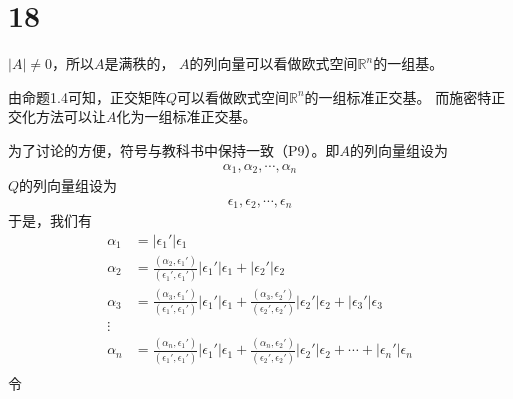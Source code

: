 \documentclass{article}
\begin{document}
\section*{18}

$|A| \neq 0$，所以$A$是满秩的，
$A$的列向量可以看做欧式空间$\mathbb{R}^n$的一组基。

由命题1.4可知，正交矩阵$Q$可以看做欧式空间$\mathbb{R}^n$的一组标准正交基。
而施密特正交化方法可以让$A$化为一组标准正交基。

为了讨论的方便，符号与教科书中保持一致（P9）。即$A$的列向量组设为
\begin{align*}
  \alpha_1, \alpha_2, \cdots, \alpha_n
\end{align*}
$Q$的列向量组设为
\begin{align*}
  \epsilon_1, \epsilon_2, \cdots, \epsilon_n
\end{align*}
于是，我们有
\begin{align*}
  \alpha_1 & = |\epsilon_1'| \epsilon_1                                                                                       \\
  \alpha_2 & = \frac{(\alpha_2, \epsilon_1')}{(\epsilon_1', \epsilon_1')} |\epsilon_1'| \epsilon_1 + |\epsilon_2'| \epsilon_2 \\
  \alpha_3 & = \frac{(\alpha_3, \epsilon_1')}{(\epsilon_1', \epsilon_1')} |\epsilon_1'| \epsilon_1 +
  \frac{(\alpha_3, \epsilon_2')}{(\epsilon_2', \epsilon_2')} |\epsilon_2'| \epsilon_2 + |\epsilon_3'| \epsilon_3              \\
  \vdots                                                                                                                      \\
  \alpha_n & = \frac{(\alpha_n, \epsilon_1')}{(\epsilon_1', \epsilon_1')} |\epsilon_1'| \epsilon_1 +
  \frac{(\alpha_n, \epsilon_2')}{(\epsilon_2', \epsilon_2')} |\epsilon_2'| \epsilon_2 + \cdots + |\epsilon_n'| \epsilon_n     \\
\end{align*}
令
\end{document}
